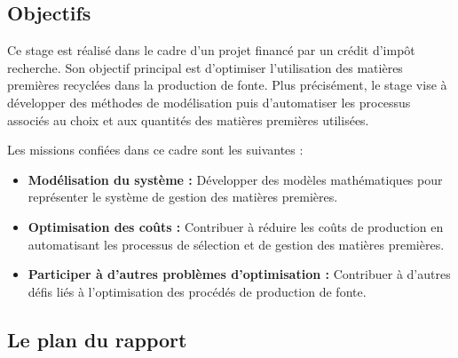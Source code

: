 \documentclass[12pt]{article}
\begin{document}
\subsection{Objectifs}

Ce stage est réalisé dans le cadre d'un projet financé par un crédit 
d'impôt recherche. Son objectif principal est d'optimiser l'utilisation 
des matières premières recyclées dans la production de fonte. Plus 
précisément, le stage vise à développer des méthodes de modélisation puis 
d'automatiser les processus associés au choix et aux quantités des matières
premières utilisées.

Les missions confiées dans ce cadre sont les suivantes :

\begin{itemize}
\item \textbf{Modélisation du système :} Développer des modèles mathématiques pour représenter le système de gestion des matières premières.
\item \textbf{Optimisation des coûts :} Contribuer à réduire les coûts de production en automatisant les processus de sélection et de gestion des matières premières.
\item \textbf{Participer à d'autres problèmes d'optimisation :} Contribuer à d'autres défis liés à l'optimisation des procédés de production de fonte.
\end{itemize}

\subsection{Le plan du rapport}



 

\end{document}
